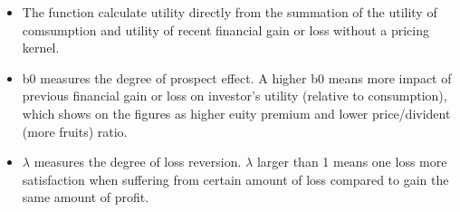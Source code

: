 \documentclass{article}
\begin{document}
\begin{itemize}
	\item The function calculate utility directly from the summation of the utility of comsumption and utility of recent financial gain or loss without a pricing kernel.
	
	\item  b0 measures the degree of prospect effect. A higher b0 means more impact of previous financial gain or loss on investor's utility (relative to consumption), which shows on the figures as higher euity premium and lower price/divident (more fruits) ratio.
	
	\item  $\lambda$ measures the degree of loss reversion. $\lambda$ larger than 1 means one loss more satisfaction when suffering from certain amount of loss compared to gain the same amount of profit.
\end{itemize}
\end{document}
